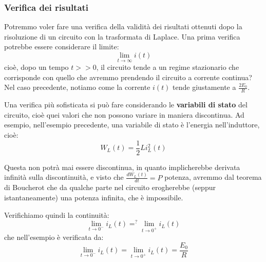 \documentclass[a4paper,11pt]{article}
\begin{document}
\subsubsection{Verifica dei risultati}
Potremmo voler fare una verifica della validità dei risultati ottenuti dopo la risoluzione di un circuito con la trasformata di Laplace.
Una prima verifica potrebbe essere considerare il limite:
$$
\lim_{t\rightarrow\infty} i(t)
$$
cioè, dopo un tempo $t >> 0$, il circuito tende a un regime stazionario che corrisponde con quello che avremmo prendendo il circuito a corrente continua? 
Nel caso precedente, notiamo come la corrente $i(t)$ tende giustamente a $\frac{2 E_0}{R}$.

Una verifica più sofisticata si può fare considerando le \textbf{variabili di stato} del circuito, cioè quei valori che non possono variare in maniera discontinua. 
Ad esempio, nell'esempio precedente, una variabile di stato è l'energia nell'induttore, cioè:
$$
W_L(t) = \frac{1}{2}L i_L^2(t)
$$

Questa non potrà mai essere discontinua, in quanto implicherebbe derivata infinità sulla discontinuità, e visto che $\frac{d W_L(t)}{dt} = P$ potenza, avremmo dal teorema di Boucherot che da qualche parte nel circuito erogherebbe (seppur istantaneamente) una potenza infinita, che è impossibile.

Verifichiamo quindi la continuità:
$$
\lim_{t \rightarrow 0^-} i_L(t) =^? \lim_{t \rightarrow 0^+} i_L(t)
$$
che nell'esempio è verificata da:
$$
\lim_{t \rightarrow 0^-} i_L(t) = \lim_{t \rightarrow 0^+} i_L(t) = \frac{E_0}{R}
$$
\end{document}
